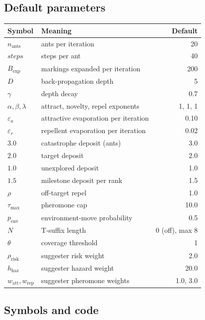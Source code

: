 \documentclass[11pt,a4paper]{article}
\newcommand{\Tau}{\tau_{\max}}
\begin{document}
\subsection{Default parameters}

\begin{center}
\small
\begin{tabular}{@{}llr@{}}
\toprule
Symbol & Meaning & Default \\
\midrule
$n_{\mathrm{ants}}$ & ants per iteration & 20 \\
$\mathit{steps}$ & steps per ant & 40 \\
$B_{\mathrm{exp}}$ & markings expanded per iteration & 200 \\
$D$ & back-propagation depth & 5 \\
$\gamma$ & depth decay & 0.7 \\
$\alpha,\beta,\lambda$ & attract, novelty, repel exponents & 1, 1, 1 \\
$\varepsilon_a$ & attractive evaporation per iteration & 0.10 \\
$\varepsilon_r$ & repellent evaporation per iteration & 0.02 \\
$3.0$ & catastrophe deposit (ants) & 3.0 \\
$2.0$ & target deposit & 2.0 \\
$1.0$ & unexplored deposit & 1.0 \\
$1.5$ & milestone deposit per rank & 1.5 \\
$\rho$ & off-target repel & 1.0 \\
$\Tau$ & pheromone cap & 10.0 \\
$p_{\mathrm{env}}$ & environment-move probability & 0.5 \\
$N$ & T-suffix length & 0 (off), max 8 \\
$\theta$ & coverage threshold & 1 \\
$\rho_{\mathrm{risk}}$ & suggester risk weight & 2.0 \\
$h_{\mathrm{haz}}$ & suggester hazard weight & 20.0 \\
$w_{\mathrm{att}},w_{\mathrm{rep}}$ & suggester pheromone weights & 1.0, 3.0 \\
\bottomrule
\end{tabular}
\end{center}

\subsection{Symbols and code}
\end{document}
